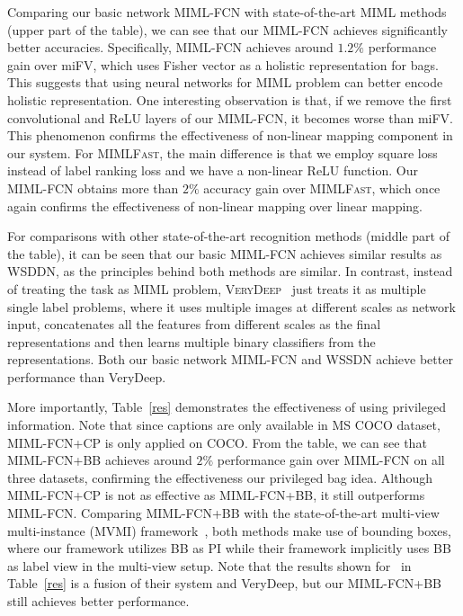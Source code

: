 \documentclass[10pt,twocolumn,letterpaper]{article}
\begin{document}
Comparing our basic network \textsc{MIML-FCN} with
state-of-the-art MIML methods (upper part of the table), we can
see that our MIML-FCN achieves significantly better accuracies.
Specifically, \textsc{MIML-FCN} achieves around $1.2\%$
performance gain over miFV, which uses Fisher vector as a holistic
representation for bags. This suggests that using neural networks
for MIML problem can better encode holistic representation. One
interesting observation is that, if we remove the first
convolutional and ReLU layers of our \textsc{MIML-FCN}, it becomes
worse than miFV. This phenomenon confirms the effectiveness of
non-linear mapping component in our system. For \textsc{MIMLFast},
the main difference is that we employ square loss instead of label
ranking loss and we have a non-linear ReLU function. Our MIML-FCN
obtains more than $2\%$ accuracy gain over \textsc{MIMLFast},
which once again confirms the effectiveness of non-linear mapping
over linear mapping.

For comparisons with other state-of-the-art recognition methods
(middle part of the table), it can be seen that our basic MIML-FCN
achieves similar results as WSDDN, as the principles behind both
methods are similar. In contrast, instead of treating the task as
MIML problem, \textsc{VeryDeep}~\cite{Simonyan2014} just treats it
as multiple single label problems, where it uses multiple images
at different scales as network input, concatenates all the
features from different scales as the final representations and
then learns multiple binary classifiers from the representations.
Both our basic network \textsc{MIML-FCN} and \textsc{WSSDN}
achieve better performance than VeryDeep.

More importantly, Table~\ref{res} demonstrates the effectiveness
of using privileged information. Note that since captions are only
available in \textsc{MS COCO} dataset, MIML-FCN+CP is only applied
on COCO. From the table, we can see that \textsc{MIML-FCN+BB}
achieves around $2\%$ performance gain over MIML-FCN on all three
datasets, confirming the effectiveness our privileged bag idea.
Although \textsc{MIML-FCN+CP} is not as effective as
\textsc{MIML-FCN+BB}, it still outperforms \textsc{MIML-FCN}.
Comparing \textsc{MIML-FCN+BB} with the state-of-the-art
multi-view multi-instance (MVMI) framework~\cite{Yang2016a}, both
methods make use of bounding boxes, where our framework utilizes
BB as PI while their framework implicitly uses BB as label view in
the multi-view setup. Note that the results shown
for~\cite{Yang2016a} in Table~\ref{res} is a fusion of their
system and VeryDeep, but our \textsc{MIML-FCN+BB} still achieves
better performance.
\end{document}
